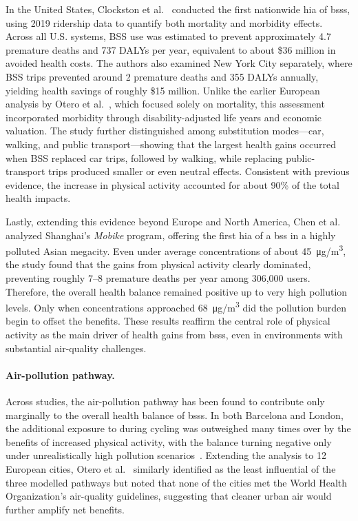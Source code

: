     In the United States, Clockston et al.~\cite{Clockston2021} conducted the first nationwide \ac{hia} of \acp{bss}, using 2019 ridership data to quantify both mortality and morbidity effects. Across all U.S. systems, BSS use was estimated to prevent approximately 4.7 premature deaths and 737 DALYs per year, equivalent to about \$36 million in avoided health costs. The authors also examined New York City separately, where BSS trips prevented around 2 premature deaths and 355 DALYs annually, yielding health savings of roughly \$15 million. Unlike the earlier European analysis by Otero et al.~\cite{Otero2018}, which focused solely on mortality, this assessment incorporated morbidity through disability-adjusted life years and economic valuation. The study further distinguished among substitution modes—car, walking, and public transport—showing that the largest health gains occurred when BSS replaced car trips, followed by walking, while replacing public-transport trips produced smaller or even neutral effects. Consistent with previous evidence, the increase in physical activity accounted for about 90\% of the total health impacts.

    Lastly, extending this evidence beyond Europe and North America, Chen et al.~\cite{Chen2023} analyzed Shanghai’s \textit{Mobike} program, offering the first \ac{hia} of a \ac{bss} in a highly polluted Asian megacity. Even under average  concentrations of about 45~\si{\micro g/m^3}, the study found that the gains from physical activity clearly dominated, preventing roughly 7–8 premature deaths per year among 306,000 users. Therefore, the overall health balance remained positive up to very high pollution levels. Only when  concentrations approached 68~\si{\micro g/m^3} did the pollution burden begin to offset the benefits. These results reaffirm the central role of physical activity as the main driver of health gains from \acp{bss}, even in environments with substantial air-quality challenges.


    \paragraph{Air-pollution pathway.}

    Across studies, the air-pollution pathway has been found to contribute only marginally to the overall health balance of \acp{bss}. In both Barcelona and London, the additional exposure to  during cycling was outweighed many times over by the benefits of increased physical activity, with the balance turning negative only under unrealistically high pollution scenarios~\cite{Rojas-Rueda2011, Woodcock2014}. Extending the analysis to 12 European cities, Otero et al.~\cite{Otero2018} similarly identified  as the least influential of the three modelled pathways but noted that none of the cities met the World Health Organization’s air-quality guidelines, suggesting that cleaner urban air would further amplify net benefits.
    
